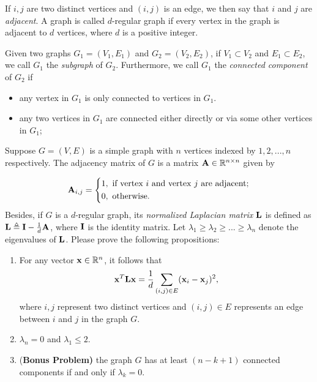\documentclass[english,onecolumn]{IEEEtran}
\newcommand{\Rbb}{\mathbb{R}}
\newcommand{\bA}{{\bf A}}
\newcommand{\bI}{{\bf I}}
\newcommand{\bL}{{\bf L}}
\newcommand{\bx}{{\bf x}}
\begin{document}
 If $i,j$ are two distinct vertices and $(i,j)$ is an edge, we then say that $i$ and $j$ are \textit{adjacent}. A graph is called $d$-regular graph if every vertex in the graph is adjacent to $d$ vertices, where $d$ is a positive integer.

 Given two graphs $G_1=(V_1,E_1)$ and $G_2=(V_2,E_2)$, if $V_1\subset V_2$ and $E_1\subset E_2$, we call $G_1$ the \textit{subgraph} of $G_2$. 
Furthermore,  we call $G_1$ the \textit{connected component} of $G_2$ 
if 
\begin{itemize}
    \item 
	any vertex in $G_1$ is only connected to vertices in $G_1$.
	\item 
	any two vertices in $G_1$ are connected either directly or via some other vertices in $G_1$;
\end{itemize}
\vspace{3mm}
\noindent 
Suppose $G=(V,E)$ is a simple graph with $n$ vertices indexed by $1,2,...,n$ respectively. 
The adjacency matrix of $G$ is a matrix $\bA\in \Rbb^{n\times n}$ given by

\begin{equation}
\bA_{i,j}=\left\{
\begin{aligned}
1 &, \text{ if vertex } i \text{ and vertex } j \text{ are adjacent;}\\
0 &, \text{ otherwise.}
\end{aligned}
\right.
\end{equation}
Besides, if $G$ is a $d$-regular graph, its \textit{normalized Laplacian matrix} $\bL$ is defined as $\bL\triangleq \bI-\frac{1}{d}\bA$, where $\bI$ is the identity matrix. 
Let $\lambda_1\geq \lambda_2\geq...\geq \lambda_n$ denote the eigenvalues of $\bL$. 
Please prove the following propositions:
\begin{enumerate}
    \item For any vector $\bx \in \Rbb^n$, it follows that 
	\begin{equation}
	\label{C1+}
		\bx^T\bL\bx=\frac{1}{d}\sum_{(i,j)\in E}(\bx_i-\bx_j)^2,
	\end{equation} 
	where $i,j$ represent two distinct vertices and $(i,j)\in E$ represents an edge between $i$ and $j$ in the graph $G$.
	\item $\lambda_n=0$ and $\lambda_1\leq 2$.
	\item {\color{blue}(\textbf{Bonus Problem)}} the graph $G$ has at least $(n-k+1)$ connected components if and only if $\lambda_k=0$. 
\end{enumerate}
\end{document}
